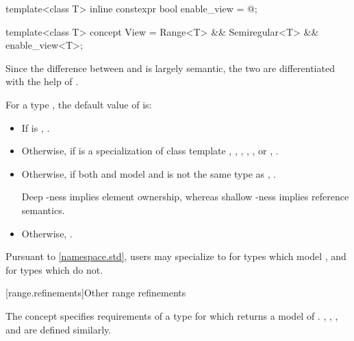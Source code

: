 %
%
\begin{itemdecl}
template<class T>
  inline constexpr bool enable_view = @\seebelow@;

template<class T>
  concept View =
    Range<T> && Semiregular<T> && enable_view<T>;
\end{itemdecl}

\begin{itemdescr}
\pnum
Since the difference between  and  is largely
semantic, the two are differentiated with the help of .

\pnum
For a type , the default value of  is:
\begin{itemize}

\item If  is , .
\item Otherwise, if  is a specialization of class template
  ,
  ,
  ,
  ,
  , or
  , .
\item Otherwise, if both  and  model 
  and  is not the same type as
  ,
  .
  \begin{note}
  Deep -ness implies element ownership,
  whereas shallow -ness implies reference semantics.
  \end{note}
\item Otherwise, .
\end{itemize}

\pnum
Pursuant to \ref{namespace.std}, users may specialize 
to  for types which model ,
and  for types which do not.
\end{itemdescr}

[range.refinements]{Other range refinements}

\pnum
The  concept specifies requirements of a
 type for which  returns
a model of .
, , ,
and  are defined similarly.

